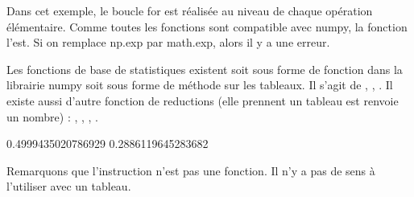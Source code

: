 \documentclass[letterpaper,10pt,english]{sphinxhowto}
\begin{document}
\sphinxAtStartPar
Dans cet exemple, le boucle for est réalisée au niveau de chaque opération élémentaire. Comme toutes les fonctions sont compatible avec numpy, la fonction  l’est. Si on remplace np.exp par math.exp, alors il y a une erreur.

\sphinxAtStartPar
Les fonctions de base de statistiques existent soit sous forme de fonction dans la librairie numpy soit sous forme de méthode sur les tableaux. Il s’agit de , , . Il existe aussi d’autre fonction de reductions (elle prennent un tableau est renvoie un nombre) : , , , .

\begin{sphinxVerbatim}[commandchars=\\\{\}]
  
 
\end{sphinxVerbatim}

\begin{sphinxVerbatim}[commandchars=\\\{\}]
0.4999435020786929
0.2886119645283682
\end{sphinxVerbatim}

\sphinxAtStartPar
Remarquons que l’instruction  n’est pas une fonction. Il n’y a pas de sens à l’utiliser avec un tableau.

\begin{sphinxVerbatim}[commandchars=\\\{\}]
  
 
      
\end{sphinxVerbatim}
\end{document}

